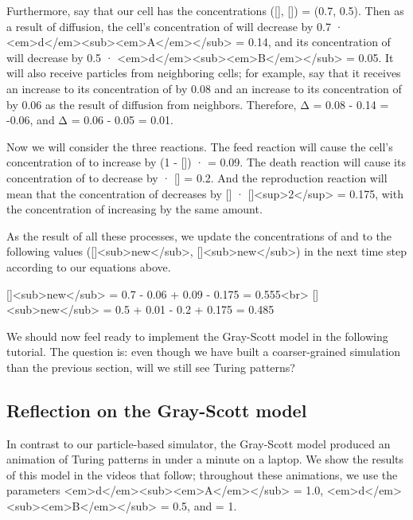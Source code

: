 {{Furthermore, say that our cell has the concentrations ([], []) = (0.7, 0.5). Then as a result of diffusion, the cell's concentration of  will decrease by 0.7 · <em>d</em><sub><em>A</em></sub> = 0.14, and its concentration of  will decrease by 0.5 · <em>d</em><sub><em>B</em></sub> = 0.05. It will also receive particles from neighboring cells; for example, say that it receives an increase to its concentration of  by 0.08 and an increase to its concentration of  by 0.06 as the result of diffusion from neighbors. Therefore, Δ = 0.08 - 0.14 = -0.06, and Δ = 0.06 - 0.05 = 0.01.

Now we will consider the three reactions. The feed reaction will cause the cell's concentration of  to increase by (1 - []) ·  = 0.09. The death reaction will cause its concentration of  to decrease by  · [] = 0.2. And the reproduction reaction will mean that the concentration of  decreases by [] · []<sup>2</sup> = 0.175, with the concentration of  increasing by the same amount.

As the result of all these processes, we update the concentrations of  and  to the following values ([]<sub>new</sub>, []<sub>new</sub>) in the next time step according to our equations above.

[]<sub>new</sub> = 0.7 - 0.06 + 0.09 - 0.175 = 0.555<br>
[]<sub>new</sub> = 0.5 + 0.01 - 0.2 + 0.175 = 0.485

We should now feel ready to implement the Gray-Scott model in the following tutorial. The question is: even though we have built a coarser-grained simulation than the previous section, will we still see Turing patterns?


\FloatBarrier
{}
\subsection{Reflection on the Gray-Scott model}

In contrast to our particle-based simulator, the Gray-Scott model produced an animation of Turing patterns in under a minute on a laptop. We show the results of this model in the videos that follow; throughout these animations, we use the parameters <em>d</em><sub><em>A</em></sub> = 1.0, <em>d</em><sub><em>B</em></sub> = 0.5, and  = 1.

}}
